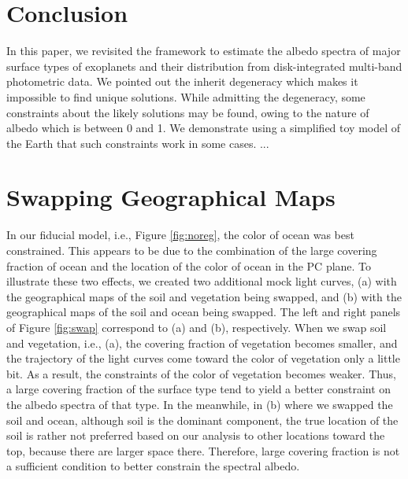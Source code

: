 \documentclass[iop,numberedappendix,apj,]{emulateapj}
\begin{document}
\section{Conclusion}
\label{s:conclusion}

In this paper, we revisited the framework to estimate the albedo spectra of major surface types of exoplanets and their distribution from disk-integrated multi-band photometric data. 
We pointed out the inherit degeneracy which makes it impossible to find unique solutions. 
While admitting the degeneracy, some constraints about the likely solutions may be found, owing to the nature of albedo which is between 0 and 1. 
We demonstrate using a simplified toy model of the Earth that such constraints work in some cases. 
...





\appendix


\section{Swapping Geographical Maps}

In our fiducial model, i.e., Figure \ref{fig:noreg}, the color of ocean was best constrained. 
%
This appears to be due to the combination of the large covering fraction of ocean and the location of the color of ocean in the PC plane. 
To illustrate these two effects, we created two additional mock light curves, (a) with the geographical maps of the soil and vegetation being swapped, and  (b) with the geographical maps of the soil and ocean being swapped. 
The left and right panels of Figure \ref{fig:swap} correspond to (a) and (b), respectively. 
%
When we swap soil and vegetation, i.e., (a), the covering fraction of vegetation becomes smaller, and the trajectory of the light curves come toward the color of vegetation only a little bit. As a result, the constraints of the color of vegetation becomes weaker. Thus, a large covering fraction of the surface type tend to yield a better constraint on the albedo spectra of that type. 
%
In the meanwhile, in (b) where we swapped the soil and ocean, although soil is the dominant component, the true location of the soil is rather not preferred based on our analysis to other locations toward the top, because there are larger space there. 
Therefore, large covering fraction is not a sufficient condition to better constrain the spectral albedo. 
\end{document}
